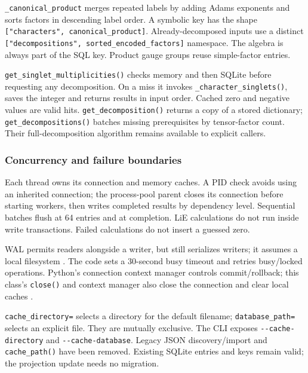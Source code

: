 \documentclass[11pt,a4paper]{article}
\numberwithin{equation}{section}
\newcommand{\code}[1]{{\small\nolinkurl{#1}}}
\begin{document}
\code{_canonical_product} merges repeated labels by adding Adams exponents and
sorts factors in descending label order. A symbolic key has the shape
\code{["characters", canonical_product]}. Already-decomposed inputs use a distinct
\code{["decompositions", sorted_encoded_factors]} namespace. The algebra is always
part of the SQL key. Product gauge groups reuse simple-factor entries.

\code{get_singlet_multiplicities()} checks memory and then SQLite before requesting
any decomposition. On a miss it invokes \code{_character_singlets()}, saves the
integer and returns results in input order. Cached zero and negative values are
valid hits. \code{get_decomposition()} returns a copy of a stored dictionary;
\code{get_decompositions()} batches missing prerequisites by tensor-factor count.
Their full-decomposition algorithm remains available to explicit callers.

\subsubsection{Concurrency and failure boundaries}
Each thread owns its connection and memory caches. A PID check avoids using an
inherited connection; the process-pool parent closes its connection before
starting workers, then writes completed results by dependency level. Sequential
batches flush at 64 entries and at completion. LiE calculations do not run inside
write transactions. Failed calculations do not insert a guessed zero.

WAL permits readers alongside a writer, but still serializes writers; it assumes
a local filesystem \cite{sqlite-wal}. The code sets a 30-second busy timeout and
retries busy/locked operations. Python's connection context manager controls
commit/rollback; this class's \code{close()} and context manager also close the
connection and clear local caches \cite{python-sqlite}.

\code{cache_directory=} selects a directory for the default filename;
\code{database_path=} selects an explicit file. They are mutually exclusive.
The CLI exposes \code{--cache-directory} and \code{--cache-database}.
Legacy JSON discovery/import and \code{cache_path()} have been removed. Existing
SQLite entries and keys remain valid; the projection update needs no migration.

\newcommand{\cacheheading}{\subsubsection}

\end{document}

